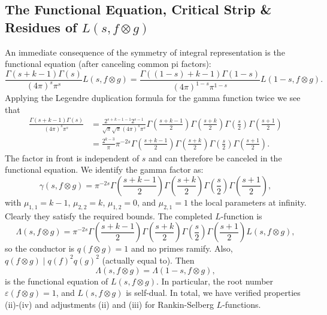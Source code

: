 \documentclass[12pt]{book}
\theoremstyle{definition}\newframedtheorem{method}{Method}
\newcommand{\g}{\gamma}
\newcommand{\G}{\Gamma}
\renewcommand{\L}{\Lambda}
\newcommand{\e}{\varepsilon}
\newcommand{\ox}{\otimes}
\newcommand{\<}{\langle}
\renewcommand{\>}{\rangle}
\begin{document}
    \subsection*{The Functional Equation, Critical Strip \& Residues of \texorpdfstring{$L(s,f \ox g)$}{L(s,fxg)}}
      An immediate consequence of the symmetry of integral representation is the functional equation (after canceling common pi factors):
      \[
        \frac{\G(s+k-1)\G(s)}{(4\pi)^{s}\pi^{s}}L(s,f \ox g) = \frac{\G((1-s)+k-1)\G(1-s)}{(4\pi)^{1-s}\pi^{1-s}}L(1-s,f \ox g).
      \]
      Applying the Legendre duplication formula for the gamma function twice we see that
      \begin{equation}\label{equ:duplication_for_Rankin-Selberg_gamma_factor}
        \begin{split}
          \frac{\G(s+k-1)\G(s)}{(4\pi)^{s}\pi^{s}} &= \frac{2^{s+k-1-1}2^{s-1}}{\sqrt{\pi}\sqrt{\pi}(4\pi)^{s}\pi^{s}}\G\left(\frac{s+k-1}{2}\right)\G\left(\frac{s+k}{2}\right)\G\left(\frac{s}{2}\right)\G\left(\frac{s+1}{2}\right) \\
          &= \frac{2^{k-3}}{\pi}\pi^{-2s}\G\left(\frac{s+k-1}{2}\right)\G\left(\frac{s+k}{2}\right)\G\left(\frac{s}{2}\right)\G\left(\frac{s+1}{2}\right).
        \end{split}
      \end{equation}
      The factor in front is independent of $s$ and can therefore be canceled in the functional equation. We identify the gamma factor as:
      \[
        \g(s,f \ox g) = \pi^{-2s}\G\left(\frac{s+k-1}{2}\right)\G\left(\frac{s+k}{2}\right)\G\left(\frac{s}{2}\right)\G\left(\frac{s+1}{2}\right),
      \]
      with $\mu_{1,1} = k-1$, $\mu_{2,2} = k$, $\mu_{1,2} = 0$, and $\mu_{2,1} = 1$ the local parameters at infinity. Clearly they satisfy the required bounds. The completed $L$-function is
      \[
        \L(s,f \ox g) = \pi^{-2s}\G\left(\frac{s+k-1}{2}\right)\G\left(\frac{s+k}{2}\right)\G\left(\frac{s}{2}\right)\G\left(\frac{s+1}{2}\right)L(s,f \ox g),
      \]
      so the conductor is $q(f \ox g) = 1$ and no primes ramify. Also, $q(f \ox g) \mid q(f)^{2}q(g)^{2}$ (actually equal to). Then
      \[
        \L(s,f \ox g) = \L(1-s,f \ox g),
      \]
      is the functional equation of $L(s,f \ox g)$. In particular, the root number $\e(f \ox g) = 1$, and $L(s,f \ox g)$ is self-dual. In total, we have verified properties (ii)-(iv) and adjustments (ii) and (iii) for Rankin-Selberg $L$-functions.
\end{document}
